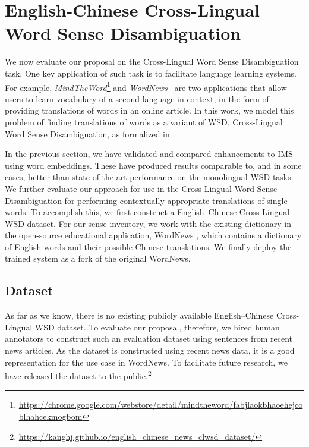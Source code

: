\section{English-Chinese Cross-Lingual Word Sense Disambiguation}
\label{section:CLWSD}





We now evaluate our proposal on the Cross-Lingual Word Sense
Disambiguation task.  One key application of such task is to
facilitate language learning systems.  For example, {\it
 MindTheWord}\footnote{\url{https://chrome.google.com/webstore/detail/mindtheword/fabjlaokbhaoehejcoblhahcekmogbom}}
and {\it WordNews}~\cite{tao2014} are two applications that allow
users to learn vocabulary of a second language in context, in the form
of providing translations of words in an online article.
In this work, we model this problem of finding translations of words
as a variant of WSD, Cross-Lingual Word Sense Disambiguation, as
formalized in \cite{tao2014}.

In the previous section, we have validated and compared enhancements to
IMS using word embeddings. These have produced results comparable to,
and in some cases, better than state-of-the-art performance on the
monolingual WSD tasks. We further evaluate our approach for use in the
Cross-Lingual Word Sense Disambiguation for performing contextually
appropriate translations of single words. To accomplish this, we first
construct a English--Chinese Cross-Lingual WSD dataset. For our sense
inventory, we work with the existing dictionary in the open-source
educational application, WordNews \cite{tao2014}, which contains a
dictionary of English words and their possible Chinese
translations. We finally deploy the trained system as a fork of the
original WordNews.

\subsection{Dataset}
 As far as we know, there 
 is no existing publicly available English--Chinese Cross-Lingual WSD dataset.
 To evaluate our proposal, therefore, we hired human annotators to construct
 such an evaluation dataset using sentences from recent news articles. As the dataset is 
 constructed using recent news data, it is a good representation for the use case in WordNews. To facilitate future research, we have released the dataset to the public.{\footnote{{\url{  https://kanghj.github.io/english_chinese_news_clwsd_dataset/}}}}
 
